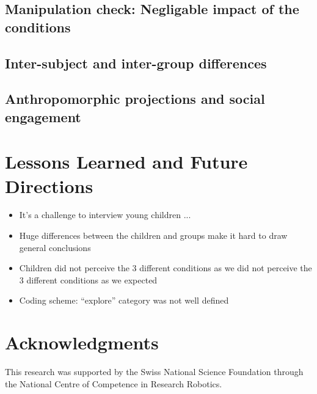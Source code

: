 \documentclass{sig-alternate}
\begin{document}
\subsection{Manipulation check: Negligable impact of the conditions}

\subsection{Inter-subject and inter-group differences}

\subsection{Anthropomorphic projections and social engagement}

\section{Lessons Learned and Future Directions}

\begin{itemize}
\item It’s a challenge to interview young children ... 
\item Huge differences between the children and groups make it hard to draw general conclusions
\item Children did not perceive the 3 different conditions as we did not perceive the 3 different conditions as we expected
\item Coding scheme: “explore” category was not well defined
\end{itemize}




\section*{Acknowledgments}

This research was supported by the Swiss National Science Foundation through the
National Centre of Competence in Research Robotics.




\balancecolumns
\end{document}
